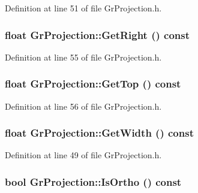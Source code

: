 Definition at line 51 of file GrProjection.h.\hypertarget{class_gr_projection_076356ed413ff2aaab1b0f6af4cf8a3c}{
\subsubsection[{GetRight}]{\setlength{\rightskip}{0pt plus 5cm}float GrProjection::GetRight () const}}
\label{class_gr_projection_076356ed413ff2aaab1b0f6af4cf8a3c}




Definition at line 55 of file GrProjection.h.\hypertarget{class_gr_projection_08d099fb02121d3ee0d6f4637c796ae7}{
\subsubsection[{GetTop}]{\setlength{\rightskip}{0pt plus 5cm}float GrProjection::GetTop () const}}
\label{class_gr_projection_08d099fb02121d3ee0d6f4637c796ae7}




Definition at line 56 of file GrProjection.h.\hypertarget{class_gr_projection_eac5317efd520d72958216a801915f35}{
\subsubsection[{GetWidth}]{\setlength{\rightskip}{0pt plus 5cm}float GrProjection::GetWidth () const}}
\label{class_gr_projection_eac5317efd520d72958216a801915f35}




Definition at line 49 of file GrProjection.h.\hypertarget{class_gr_projection_abd3817acc3eeef6f80ff8e30fc1467c}{
\subsubsection[{IsOrtho}]{\setlength{\rightskip}{0pt plus 5cm}bool GrProjection::IsOrtho () const}}
\label{class_gr_projection_abd3817acc3eeef6f80ff8e30fc1467c}




